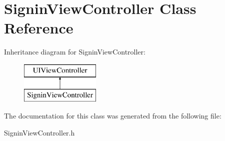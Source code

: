 \hypertarget{interface_signin_view_controller}{\section{Signin\+View\+Controller Class Reference}
\label{interface_signin_view_controller}
}
Inheritance diagram for Signin\+View\+Controller\+:\begin{figure}[H]
\begin{center}
\leavevmode
\includegraphics[height=2.000000cm]{interface_signin_view_controller}
\end{center}
\end{figure}


The documentation for this class was generated from the following file\+:\begin{DoxyCompactItemize}
\item 
Signin\+View\+Controller.\+h\end{DoxyCompactItemize}
